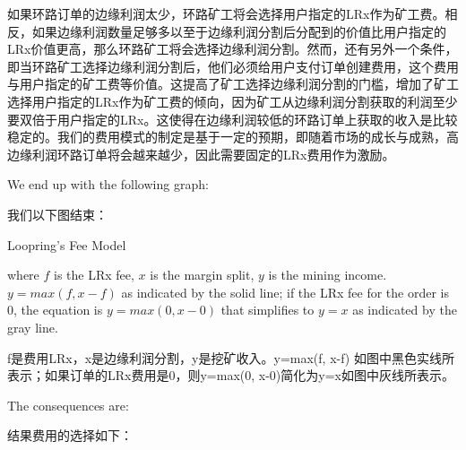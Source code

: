 \documentclass[UTF8,nofonts]{ctexart}
\makeatletter
\newenvironment{figurehere}
 {\def\@captype{figure}}
 {}
\makeatother
\begin{document}
\begin{multicols}{2}
如果环路订单的边缘利润太少，环路矿工将会选择用户指定的LRx作为矿工费。相反，如果边缘利润数量足够多以至于边缘利润分割后分配到的价值比用户指定的LRx价值更高，那么环路矿工将会选择边缘利润分割。然而，还有另外一个条件，即当环路矿工选择边缘利润分割后，他们必须给用户支付订单创建费用，这个费用与用户指定的矿工费等价值。这提高了矿工选择边缘利润分割的门槛，增加了矿工选择用户指定的LRx作为矿工费的倾向，因为矿工从边缘利润分割获取的利润至少要双倍于用户指定的LRx。这使得在边缘利润较低的环路订单上获取的收入是比较稳定的。我们的费用模式的制定是基于一定的预期，即随着市场的成长与成熟，高边缘利润环路订单将会越来越少，因此需要固定的LRx费用作为激励。


We end up with the following graph:

我们以下图结束：


\begin{center}
\begin{figurehere}
\centering
{}
\caption{Loopring's Fee Model}
\label{fig:feemodel}
\end{figurehere}
\end{center}


where $f$ is the LRx fee, $x$ is the margin split, $y$ is the mining income. $y=max(f, x-f)$ as indicated by the solid line; if the LRx fee for the order is $0$, the equation is $y=max(0, x - 0)$ that simplifies to $y=x$ as indicated by the gray line.

f是费用LRx，x是边缘利润分割，y是挖矿收入。y=max(f, x-f) 如图中黑色实线所表示；如果订单的LRx费用是0，则y=max(0, x-0)简化为y=x如图中灰线所表示。



The consequences are:  

结果费用的选择如下：



\end{multicols}
\end{document}
